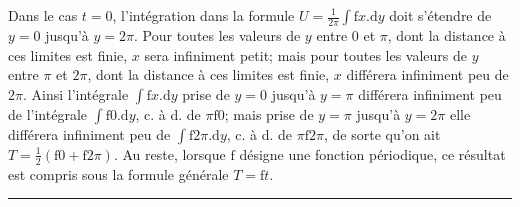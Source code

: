 \par
Dans le cas \(t=0\), l’intégration dans la formule \(U=\frac{1}{2\pi}\int\mathrm{f}x.\mathrm{d}y\) doit s’étendre de \(y=0\) jusqu’à \(y=2\pi\). Pour toutes les valeurs de \(y\) entre \(0\) et \(\pi\), dont la distance à ces limites est finie, \(x\) sera infiniment petit; mais pour toutes les valeurs de \(y\) entre \(\pi\) et \(2\pi\), dont la distance à ces limites est finie, \(x\) différera infiniment peu de \(2\pi\). Ainsi l’intégrale \(\int\mathrm{f}x.\mathrm{d}y\) prise de \(y=0\) jusqu’à \(y=\pi\) différera infiniment peu de l’intégrale \(\int\mathrm{f}0.\mathrm{d}y\), c. à d. de \(\pi\mathrm{f}0\); mais prise de \(y=\pi\) jusqu’à \(y=2\pi\) elle différera infiniment peu de \(\int\mathrm{f}2\pi.\mathrm{d}y\), c. à d. de \(\pi\mathrm{f}2\pi\), de sorte qu’on ait \(T=\frac12(\mathrm{f}0+\mathrm{f}2\pi)\). Au reste, lorsque \(\mathrm{f}\) désigne une fonction périodique, ce résultat est compris sous la formule générale \(T=\mathrm{f}t\).
\par\medskip\begin{center}\rule{.24\linewidth}{.3pt}\end{center}
\endgroup
